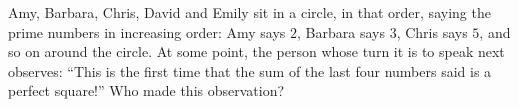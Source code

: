 Amy, Barbara, Chris, David and Emily sit in a circle, in that order, saying the prime numbers in increasing order: Amy says $2$, Barbara says $3$, Chris says $5$, and so on around the circle. At some point, the person whose turn it is to speak next observes: ``This is the first time that the sum of the last four numbers said is a perfect square!'' Who made this observation?
